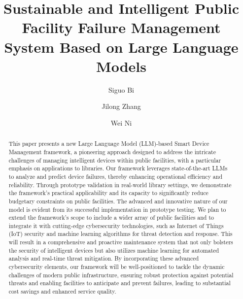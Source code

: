 \documentclass[preprint,12pt]{elsarticle}
\begin{document}
\begin{frontmatter}


\title{Sustainable and Intelligent Public Facility Failure Management System Based on Large Language Models}

\author[1]{Siguo Bi}
\author[1]{Jilong Zhang}
\author[2]{Wei Ni}








\begin{abstract}
This paper presents a new Large Language Model (LLM)-based Smart Device Management framework, a pioneering approach designed to address the intricate challenges of managing intelligent devices within public facilities, with a particular emphasis on applications to libraries. Our framework leverages state-of-the-art LLMs to analyze and predict device failures, thereby enhancing operational efficiency and reliability. Through prototype validation in real-world library settings, we demonstrate the framework's practical applicability and its capacity to significantly reduce budgetary constraints on public facilities. The advanced and innovative nature of our model is evident from its successful implementation in prototype testing. We plan to extend the framework's scope to include a wider array of public facilities and to integrate it with cutting-edge cybersecurity technologies, such as Internet of Things (IoT) security and machine learning algorithms for threat detection and response. This will result in a comprehensive and proactive maintenance system that not only bolsters the security of intelligent devices but also utilizes machine learning for automated analysis and real-time threat mitigation. By incorporating these advanced cybersecurity elements, our framework will be well-positioned to tackle the dynamic challenges of modern public infrastructure, ensuring robust protection against potential threats and enabling facilities to anticipate and prevent failures, leading to substantial cost savings and enhanced service quality.
\end{abstract}


\end{frontmatter}
\end{document}
